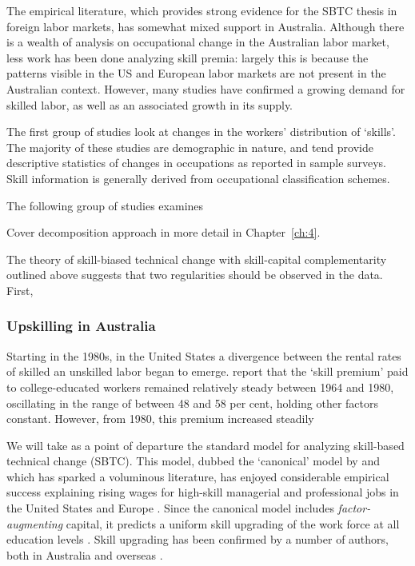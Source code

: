 The empirical literature, which provides strong evidence for the SBTC thesis in foreign labor markets, has somewhat mixed support in Australia. Although there is a wealth of analysis on occupational change in the Australian labor market, less work has been done analyzing skill premia: largely this is because the patterns visible in the US and European labor markets are not present in the Australian context. However, many studies have confirmed a growing demand for skilled labor, as well as an associated growth in its supply.

The first group of studies look at changes in the workers' distribution of `skills'. The majority of these studies are demographic in nature, and tend provide descriptive statistics of changes in occupations as reported in sample surveys. Skill information is generally derived from occupational classification schemes.

The following group of studies examines 

Cover decomposition approach in more detail in Chapter~\ref{ch:4}.

The theory of skill-biased technical change with skill-capital complementarity outlined above suggests that two regularities should be observed in the data. First, 

\subsubsection{Upskilling in Australia}

Starting in the 1980s, in the United States a divergence between the rental rates of skilled an unskilled labor began to emerge. \citet{Acemoglu2011} report that the `skill premium' paid to college-educated workers remained relatively steady between 1964 and 1980, oscillating in the range of between 48 and 58 per cent, holding other factors constant. However, from 1980, this premium increased steadily 

We will take as a point of departure the standard model for analyzing skill-based technical change (SBTC). This model, dubbed the `canonical' model by \citet{Acemoglu2011} and which has sparked a voluminous literature, has enjoyed considerable empirical success explaining rising wages for high-skill managerial and professional jobs in the United States and Europe \citep{Katz1992}. Since the canonical model includes \emph{factor-augmenting} capital, it predicts a uniform skill upgrading of the work force at all education levels \citep{Levy2003}. Skill upgrading has been confirmed by a number of authors, both in Australia \citep{Esposto2012, Wooden2000, Cully1999} and overseas \citep{Autor2008}. 

